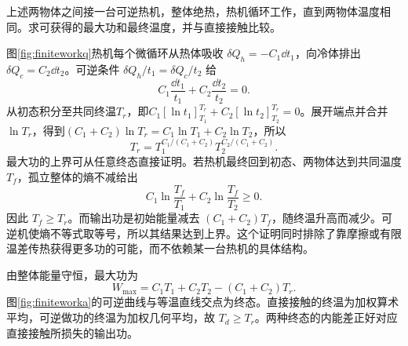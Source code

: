 
\begin{example}[有限热源间的最大功]\label{ex:finitework}
上述两物体之间接一台可逆热机，整体绝热，热机循环工作，直到两物体温度相同。求可获得的最大功和最终温度，并与直接接触比较。
\end{example}
\begin{solution}
图\ref{fig:finiteworkq}热机每个微循环从热体吸收 $\delta Q_h=-C_1\dd t_1$，向冷体排出 $\delta Q_c=C_2\dd t_2$。可逆条件 $\delta Q_h/t_1=\delta Q_c/t_2$ 给
\[
 C_1\frac{\dd t_1}{t_1}+C_2\frac{\dd t_2}{t_2}=0.
\]
从初态积分至共同终温$T_r$，即$C_1[\ln t_1]_{T_1}^{T_r}+C_2[\ln t_2]_{T_2}^{T_r}=0$。展开端点并合并$\ln T_r$，得到$(C_1+C_2)\ln T_r=C_1\ln T_1+C_2\ln T_2$，所以
\[
 T_r=T_1^{C_1/(C_1+C_2)}T_2^{C_2/(C_1+C_2)}.
\]
最大功的上界可从任意终态直接证明。若热机最终回到初态、两物体达到共同温度 $T_f$，孤立整体的熵不减给出
\[
 C_1\ln\frac{T_f}{T_1}+C_2\ln\frac{T_f}{T_2}\ge0.
\]
因此 $T_f\ge T_r$。而输出功是初始能量减去 $(C_1+C_2)T_f$，随终温升高而减少。可逆机使熵不等式取等号，所以其结果达到上界。这个证明同时排除了靠摩擦或有限温差传热获得更多功的可能，而不依赖某一台热机的具体结构。

由整体能量守恒，最大功为
\[
 W_{\max}=C_1T_1+C_2T_2-(C_1+C_2)T_r.
\]
图\ref{fig:finiteworka}的可逆曲线与等温直线交点为终态。直接接触的终温为加权算术平均，可逆做功的终温为加权几何平均，故 $T_d\ge T_r$。两种终态的内能差正好对应直接接触所损失的输出功。
\end{solution}

